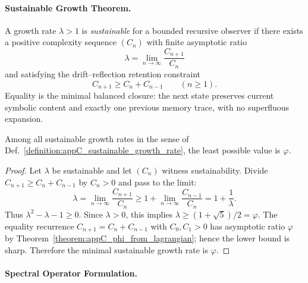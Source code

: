 \paragraph{Sustainable Growth Theorem.}
\label{paragraph:appC_main_theorem_phi_as_mimiimal_growth_rate}

\begin{definition}
\label{definition:appC_sustainable_growth_rate}
A growth rate $\lambda>1$ is \emph{sustainable} for a bounded recursive observer if
there exists a positive complexity sequence $(C_n)$ with finite asymptotic ratio
\[
\lambda=\lim_{n\to\infty}\frac{C_{n+1}}{C_n}
\]
and satisfying the drift--reflection retention constraint
\[
C_{n+1}\ge C_n+C_{n-1}\qquad(n\ge1).
\]
Equality is the minimal balanced closure: the next state preserves current
symbolic content and exactly one previous memory trace, with no superfluous
expansion.
\end{definition}

\begin{theorem}
\label{theorem:appC_phi_min_growth}
Among all sustainable growth rates in the sense of
Def.~\ref{definition:appC_sustainable_growth_rate}, the least possible value is
$\varphi$.
\end{theorem}

\begin{proof}
\label{proof:appC_phi_min_growth}
Let $\lambda$ be sustainable and let $(C_n)$ witness sustainability. Divide
$C_{n+1}\ge C_n+C_{n-1}$ by $C_n>0$ and pass to the limit:
\[
\lambda=\lim_{n\to\infty}\frac{C_{n+1}}{C_n}
\ge 1+\lim_{n\to\infty}\frac{C_{n-1}}{C_n}
=1+\frac{1}{\lambda}.
\]
Thus $\lambda^2-\lambda-1\ge0$. Since $\lambda>0$, this implies
$\lambda\ge(1+\sqrt5)/2=\varphi$. The equality recurrence
$C_{n+1}=C_n+C_{n-1}$ with $C_0,C_1>0$ has asymptotic ratio $\varphi$ by
Theorem~\ref{theorem:appC_phi_from_lagrangian}; hence the lower bound is sharp.
Therefore the minimal sustainable growth rate is $\varphi$.
\end{proof}

\paragraph{Spectral Operator Formulation.}
\label{paragraph:appC_spectral_interpretation_and_banach_operator_radius}

